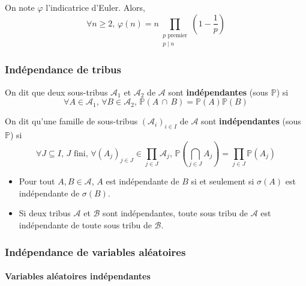 	\begin{application}
		On note $\varphi$ l'indicatrice d'Euler. Alors,
		\[ \forall n \geq 2, \, \varphi(n) = n \prod_{\substack{p \text{ premier} \\ p \mid n}} \left( 1 - \frac{1}{p} \right) \]
	\end{application}
	
	\subsubsection{Indépendance de tribus}
	
	
	\begin{definition}
		On dit que deux sous-tribus $\mathcal{A}_1$ et $\mathcal{A}_2$ de $\mathcal{A}$ sont \textbf{indépendantes} (sous $\mathbb{P}$) si
		\[ \forall A \in \mathcal{A}_1, \, \forall B \in \mathcal{A}_2, \, \mathbb{P}(A \, \cap \, B) = \mathbb{P}(A) \mathbb{P}(B) \]
	\end{definition}
	
	\begin{definition}
		On dit qu'une famille de sous-tribus $(\mathcal{A}_i)_{i \in I}$ de $\mathcal{A}$ sont \textbf{indépendantes} (sous $\mathbb{P}$) si
		\[ \forall J \subseteq I, \, J \text{ fini}, \, \forall (A_j)_{j \in J} \in \prod_{j \in J} \mathcal{A}_j, \, \mathbb{P}\left( \bigcap_{j \in J} A_j \right) = \prod_{j \in J} \mathbb{P}(A_j) \]
	\end{definition}
	
	\begin{remark}
		\begin{itemize}
			\item Pour tout $A, B \in \mathcal{A}$, $A$ est indépendante de $B$ si et seulement si $\sigma(A)$ est indépendante de $\sigma(B)$.
			\item Si deux tribus $\mathcal{A}$ et $\mathcal{B}$ sont indépendantes, toute sous tribu de $\mathcal{A}$ est indépendante de toute sous tribu de $\mathcal{B}$.
		\end{itemize}
	\end{remark}
	
	\subsubsection{Indépendance de variables aléatoires}
	
	\paragraph{Variables aléatoires indépendantes}
	
